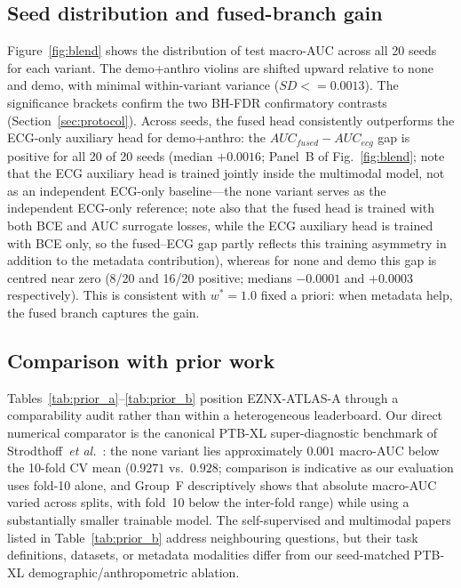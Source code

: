 \documentclass[mathematics,article,pdftex]{Definitions/mdpi}
\def\texttt#1{#1}%
\def\mathrm#1{#1}%
\def\textbf#1{#1}%
\def\leq{<=}%
\begin{document}
\subsection{Seed distribution and fused-branch gain}
Figure~\ref{fig:blend} shows the distribution of test macro-AUC across all 20 seeds for each variant. The \texttt{demo+anthro} violins are shifted upward relative to \texttt{none} and \texttt{demo}, with minimal within-variant variance ($\mathrm{SD}{\leq}0.0013$). The significance brackets confirm the two BH-FDR confirmatory contrasts (Section~\ref{sec:protocol}). Across seeds, the fused head consistently outperforms the ECG-only auxiliary head for \texttt{demo+anthro}: the $\mathrm{AUC}_{\mathrm{fused}} - \mathrm{AUC}_{\mathrm{ecg}}$ gap is positive for \textbf{all 20 of 20 seeds} (median $+0.0016$; Panel~B of Fig.~\ref{fig:blend}; note that the ECG auxiliary head is trained jointly inside the multimodal model, not as an independent ECG-only baseline---the \texttt{none} variant serves as the independent ECG-only reference; note also that the fused head is trained with both BCE and AUC surrogate losses, while the ECG auxiliary head is trained with BCE only, so the fused--ECG gap partly reflects this training asymmetry in addition to the metadata contribution), whereas for \texttt{none} and \texttt{demo} this gap is centred near zero (8/20 and 16/20 positive; medians $-0.0001$ and $+0.0003$ respectively). This is consistent with $w^{\ast}{=}1.0$ fixed a priori: when metadata help, the fused branch captures the gain.

\subsection{Comparison with prior work}
Tables~\ref{tab:prior_a}--\ref{tab:prior_b} position EZNX-ATLAS-A through a comparability audit rather than within a heterogeneous leaderboard. Our direct numerical comparator is the canonical PTB-XL super-diagnostic benchmark of Strodthoff~\textit{et al.}~\cite{Strodthoff2021}: the \texttt{none} variant lies approximately $0.001$ macro-AUC below the 10-fold CV mean ($0.9271$ vs.\ $0.928$; comparison is indicative as our evaluation uses fold-10 alone, and Group~F descriptively shows that absolute macro-AUC varied across splits, with fold~10 below the inter-fold range) while using a substantially smaller trainable model. The self-supervised and multimodal papers listed in Table~\ref{tab:prior_b} address neighbouring questions, but their task definitions, datasets, or metadata modalities differ from our seed-matched PTB-XL demographic/anthropometric ablation.
\end{document}
